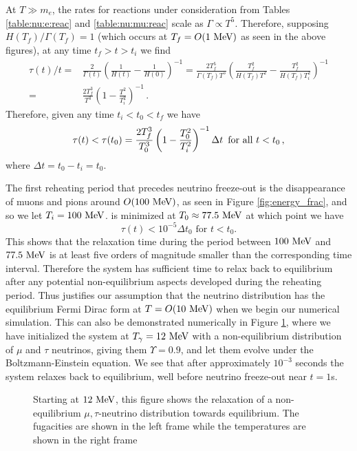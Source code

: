 At $T\gg m_e$, the rates for reactions under consideration from Tables \ref{table:nu:e:reac} and \ref{table:nu:mu:reac} scale as $\Gamma\propto T^5$.  Therefore, supposing $H(T_f)/\Gamma(T_f)=1$ (which occurs at $T_f=O(1\text{ MeV})$ as seen in the above figures), at any time $t_f>t>t_i$ we find 
\begin{align}\label{relax_time}
\tau(t)/t=&\frac{2}{\Gamma(t)}\left(\frac{1}{H(t)}-\frac{1}{H(0)}\right)^{-1}=\frac{2T_f^5}{\Gamma(T_f)T^5}\left(\frac{T_f^2}{H(T_f)T^2}-\frac{T_f^2}{H(T_f)T_i^2}\right)^{-1}\\
=&\frac{2T_f^3}{T^3}\left(1-\frac{T^2}{T_i^2}\right)^{-1}\,.
\end{align}
Therefore, given any time $t_i<t_0<t_f$ we have
\begin{equation}\label{ch6:tau_eq}
\tau(t)<\tau(t_0)=\frac{2T_f^3}{T_0^3}\left(1-\frac{T_0^2}{T_i^2}\right)^{-1}\Delta t \text{ \,for all } t<t_0\,,
\end{equation}
where $\Delta t=t_0-t_i=t_0$.

 The first reheating period that precedes neutrino freeze-out is the disappearance of muons and pions around $O(100\text{ MeV})$, as seen in Figure \ref{fig:energy_frac}, and so we let $T_i=100\text{ MeV}$.  is minimized at $T_0\approx 77.5\text{ MeV}$ at which point we have 
\begin{equation}
\tau(t)<10^{-5} \Delta t_0 \text{ for } t<t_0.
\end{equation}
This shows that the relaxation time during the period between $100\text{ MeV}$ and $77.5\text{ MeV}$ is at least five orders of magnitude smaller than the corresponding time interval.  Therefore the system has sufficient time to relax back to equilibrium after any potential non-equilibrium aspects developed during the reheating period.  Thus justifies our assumption that the neutrino distribution has the equilibrium Fermi Dirac form at $T=O(10 \text{ MeV})$ when we begin our numerical simulation. This can also be demonstrated numerically in Figure \ref{fig:relax}, where we have initialized the system at $T_\gamma=12\text{ MeV}$ with a non-equilibrium distribution of $\mu$ and $\tau$ neutrinos, giving them $\Upsilon=0.9$, and let them evolve under the Boltzmann-Einstein equation.  We see that after approximately $10^{-3}$ seconds the system relaxes back to equilibrium, well before neutrino freeze-out near $t=1$s.

\begin{figure} 
\begin{minipage}{\linewidth}
\end{minipage}
\caption{Starting at $12\text{ MeV}$, this figure shows the relaxation of a non-equilibrium $\mu,\tau$-neutrino distribution towards equilibrium. The fugacities are shown in the left frame while the temperatures are shown in the right frame}
\label{fig:relax}
 \end{figure}

